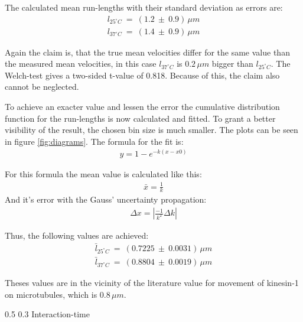 \documentclass[english, %
parskip=full, %
bibliography=totoc, %
]{scrartcl}
\makeatletter
\renewcommand\subsection{\@startsection 
   {subsection}{2}{0mm}%
   {0.5\baselineskip}%
   {0.3\baselineskip}%
   {\bfseries\sffamily\large}%
   }
\makeatother
\begin{document}
The calculated mean run-lengths with their standard deviation as errors are:
\begin{align*}
l _{25^\circ C} \ = \ (1.2 \ \pm \ 0.9) \, \mu m \\
l _{37^\circ C} \ = \ (1.4 \ \pm \ 0.9) \, \mu m
\end{align*}

Again the claim is, that the true mean velocities differ for the same value than the measured mean velocities, in this case $l _{37^\circ C}$ is \(0.2\, \mu m\) bigger than $l _{25^\circ C}$. The Welch-test gives a two-sided t-value of 0.818. Because of this, the claim also cannot be neglected. 

To achieve an exacter value and lessen the error the cumulative distribution function for the run-lengths is now calculated and fitted. To grant a better visibility of the result, the chosen bin size is much smaller. The plots can be seen in figure \ref{fig:diagrams}. The formula for the fit is:
\begin{align*}
y = 1 - e^{-k(x - x0)}
\end{align*}

For this formula the mean value is calculated like this\cite{mean_cdf}:
\begin{align*}
\bar{x} = \frac{1}{k}
\end{align*}
And it's error with the Gauss' uncertainty propagation:
\begin{align*}
\Delta x = |\frac{-1}{k^2} \Delta k|
\end{align*}

Thus, the following values are achieved:
\begin{align*}
\bar{l} _{25^\circ C} \ = \ (0.7225 \ \pm \ 0.0031) \, \mu m \\
\bar{l} _{37^\circ C} \ = \ (0.8804 \ \pm \ 0.0019) \, \mu m
\end{align*}

Theses values are in the vicinity of the literature value for movement of kinesin-1 on microtubules, which is 0.8\,$\mu m$. 

\subsection{Interaction-time}
\end{document}
